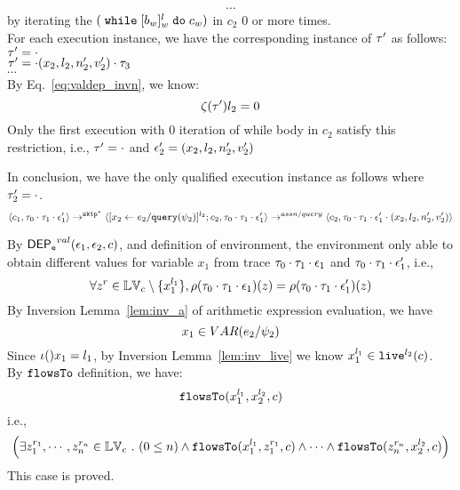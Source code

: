 \begin{subproof}
\begin{subproof}[Subproof]
\begin{enumerate}
\[ \]
\[
  \cdots
\] 
by iterating the $(\;\mathtt{while}\; [b_w]^l_w \;\mathtt{do}\; c_w)$ in $c_2$ $0$ or more times.
%
\\
%
For each execution instance, we have the corresponding instance of $\mathtt{\tau}'$ as follows:
\\
$\mathtt{\tau}'  = \cdot$
\\
$\mathtt{\tau}' = \cdot (x_2, l_2, n_2', v_2') \cdot \mathtt{\tau}_3 $
%
\\
$\cdots$
%
\\
%
By Eq.~\ref{eq:valdep_invn}, we know:
%
\[
 \mathtt{\zeta}(\mathtt{\tau}') l_2 = 0
\]
%
Only the first execution with 0 iteration of while body in $c_2$ satisfy this restriction, i.e., $\mathtt{\tau}' = \cdot$ and $\mathtt{\epsilon}_2' = (x_2, l_2, n_2', v_2')$
%
\end{enumerate}
In conclusion, we have the only qualified execution instance as follows where $\mathtt{\tau}_2' = \cdot$.
  \[
  \langle c_1, \mathtt{\tau}_0 \cdot \mathtt{\tau}_1 \cdot \mathtt{\epsilon}_1' \rangle 
  \rightarrow^{\mathtt{skip}^*} 
  \langle [\mathrel{ {x}_2 \leftarrow e_2 / {\tt query}(\psi_2) }]^{l_2} ; {c}_2, \mathtt{\tau}_0 \cdot \mathtt{\tau}_1 \cdot \mathtt{\epsilon}_1' \rangle 
  \rightarrow^{assn/query} 
  \langle {c}_2,  \mathtt{\tau}_0 \cdot \mathtt{\tau}_1 \cdot \mathtt{\epsilon}_1' \cdot (x_2, l_2, n_2', v_2') \rangle 
 \]
\end{subproof}
%
By $\mathsf{DEP_{\mathtt{e}}}^{val}(\mathtt{\epsilon}_1, \mathtt{\epsilon}_2, c)$, and definition of environment, 
the environment only able to obtain different values for variable $x_1$ 
from trace $\mathtt{\tau}_0 \cdot \mathtt{\tau}_1 \cdot \mathtt{\epsilon}_1$ and 
$\mathtt{\tau}_0 \cdot \mathtt{\tau}_1 \cdot \mathtt{\epsilon}_1'$, i.e.,
\[
  \forall z^r \in \mathbb{LV}_c \setminus \{x_1^{l_1}\} ,
  \rho(\mathtt{\tau}_0 \cdot \mathtt{\tau}_1 \cdot \mathtt{\epsilon}_1) (z) =  
  \rho(\mathtt{\tau}_0 \cdot \mathtt{\tau}_1 \cdot \mathtt{\epsilon}_1') (z)
\]
%
By {Inversion Lemma~\ref{lem:inv_a}} of arithmetic expression evaluation, we have
\[
  x_1 \in VAR(e_2 / \psi_2) 
\]
Since $\iota() x_1 = l_1$, by Inversion Lemma~\ref{lem:inv_live} we know $x_1^{l_1} \in \mathtt{live}^{l_2}(c)$.
%
\\
%
By $\mathtt{flowsTo}$ definition, we have:
%
\[
\mathtt{flowsTo}(x_1^{l_1}, {x}_2^{l_2}, c)
\]
i.e.,
%
\[
\Big(\exists z_1^{r_1}, \cdots, z_n^{r_n} \in \mathbb{LV}_{{c}} ~.~ (0 \leq n )
 \land \mathtt{flowsTo}(x_1^{l_1}, z_1^{r_1}, c) \land \cdots \land \mathtt{flowsTo}(z_n^{r_n}, {x}_2^{l_2}, c) \Big)
 \]
%
This case is proved.
\end{subproof}